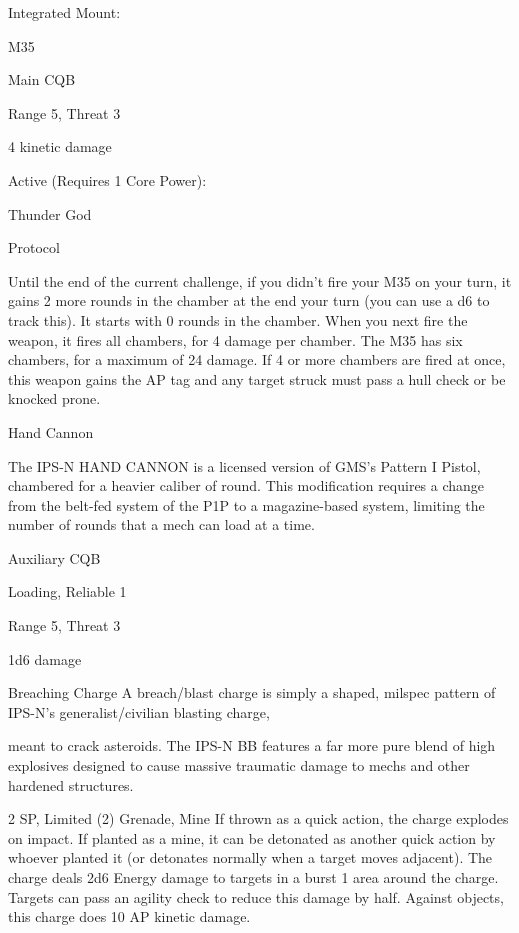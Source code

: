   Integrated Mount:
 
  M35
 
  Main CQB
 
  Range 5, Threat 3
 
  4 kinetic damage
 

  Active (Requires 1 Core Power):
 
  Thunder God
 
  Protocol
 
  Until the end of the current challenge, if you didn’t fire your M35 on your turn, it gains 2 more rounds in  
  the chamber at the end your turn (you can use a d6 to track this). It starts with 0 rounds in the chamber.  
  When you next fire the weapon, it fires all chambers, for 4 damage per chamber. The M35 has six  
  chambers, for a maximum of 24 damage. If 4 or more chambers are fired at once, this weapon gains  
  the AP tag and any target struck must pass a hull check or be knocked prone. 

Hand Cannon  

                                                                                                                 


The IPS-N HAND CANNON is a licensed version of GMS’s Pattern I Pistol, chambered for a heavier caliber  
of round. This modification requires a change from the belt-fed system of the P1P to a magazine-based  
system, limiting the number of rounds that a mech can load at a time.   

Auxiliary CQB
 
Loading, Reliable 1
 
Range 5, Threat 3
 
1d6 damage
 

Breaching Charge  
A breach/blast charge is simply a shaped, milspec pattern of IPS-N’s generalist/civilian blasting charge,  

meant to crack asteroids. The IPS-N BB features a far more pure blend of high explosives designed to  
cause massive traumatic damage to mechs and other hardened structures.   

2 SP, Limited (2)  
Grenade, Mine  
If thrown as a quick action, the charge explodes on impact. If planted as a mine, it can be  
detonated as another quick action by whoever planted it (or detonates normally when a target  
moves adjacent). The charge deals 2d6 Energy damage to targets in a burst 1 area around the  
charge. Targets can pass an agility check to reduce this damage by half. Against objects, this  
charge does 10 AP kinetic damage.  

